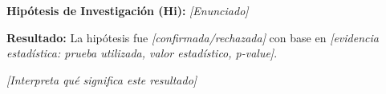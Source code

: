 \textbf{Hipótesis de Investigación (Hi):} \textit{{[Enunciado]}}

\textbf{Resultado:} La hipótesis fue \textit{{[confirmada/rechazada]}} con base en \textit{{[evidencia estadística: prueba utilizada, valor estadístico, p-value]}}.

\textit{{[Interpreta qué significa este resultado]}}

%
%

